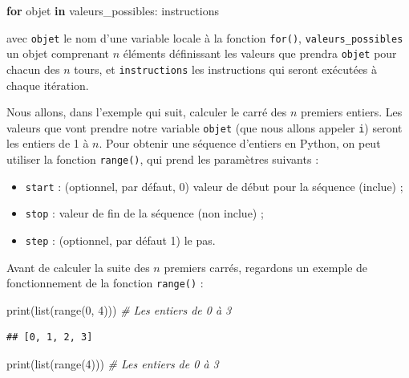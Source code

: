 \documentclass[
  12pt,
]{book}
\newenvironment{Shaded}{\begin{snugshade}}{\end{snugshade}}
\newcommand{\BuiltInTok}[1]{#1}
\newcommand{\CommentTok}[1]{\textcolor[rgb]{0.56,0.35,0.01}{\textit{#1}}}
\newcommand{\ControlFlowTok}[1]{\textcolor[rgb]{0.13,0.29,0.53}{\textbf{#1}}}
\newcommand{\DecValTok}[1]{\textcolor[rgb]{0.00,0.00,0.81}{#1}}
\newcommand{\KeywordTok}[1]{\textcolor[rgb]{0.13,0.29,0.53}{\textbf{#1}}}
\newcommand{\NormalTok}[1]{#1}
\providecommand{\tightlist}{%
  \setlength{\itemsep}{0pt}\setlength{\parskip}{0pt}}
\numberwithin{equation}{section}
\numberwithin{countremarque}{section}
\begin{document}
\begin{Shaded}
\begin{Highlighting}[]
\ControlFlowTok{for}\NormalTok{ objet }\KeywordTok{in}\NormalTok{ valeurs\_possibles:}
\NormalTok{  instructions}
\end{Highlighting}
\end{Shaded}

avec \texttt{objet} le nom d'une variable locale à la fonction \texttt{for()}, \texttt{valeurs\_possibles} un objet comprenant \(n\) éléments définissant les valeurs que prendra \texttt{objet} pour chacun des \(n\) tours, et \texttt{instructions} les instructions qui seront exécutées à chaque itération.

Nous allons, dans l'exemple qui suit, calculer le carré des \(n\) premiers entiers. Les valeurs que vont prendre notre variable \texttt{objet} (que nous allons appeler \texttt{i}) seront les entiers de 1 à \(n\). Pour obtenir une séquence d'entiers en Python, on peut utiliser la fonction \texttt{range()}, qui prend les paramètres suivants :

\begin{itemize}
\tightlist
\item
  \texttt{start} : (optionnel, par défaut, 0) valeur de début pour la séquence (inclue) ;
\item
  \texttt{stop} : valeur de fin de la séquence (non inclue) ;
\item
  \texttt{step} : (optionnel, par défaut 1) le pas.
\end{itemize}

Avant de calculer la suite des \(n\) premiers carrés, regardons un exemple de fonctionnement de la fonction \texttt{range()} :

\begin{Shaded}
\begin{Highlighting}[]
\BuiltInTok{print}\NormalTok{(}\BuiltInTok{list}\NormalTok{(}\BuiltInTok{range}\NormalTok{(}\DecValTok{0}\NormalTok{, }\DecValTok{4}\NormalTok{))) }\CommentTok{\# Les entiers de 0 à 3}
\end{Highlighting}
\end{Shaded}

\begin{lstlisting}
## [0, 1, 2, 3]
\end{lstlisting}

\begin{Shaded}
\begin{Highlighting}[]
\BuiltInTok{print}\NormalTok{(}\BuiltInTok{list}\NormalTok{(}\BuiltInTok{range}\NormalTok{(}\DecValTok{4}\NormalTok{))) }\CommentTok{\# Les entiers de 0 à 3}
\end{Highlighting}
\end{Shaded}
\end{document}

